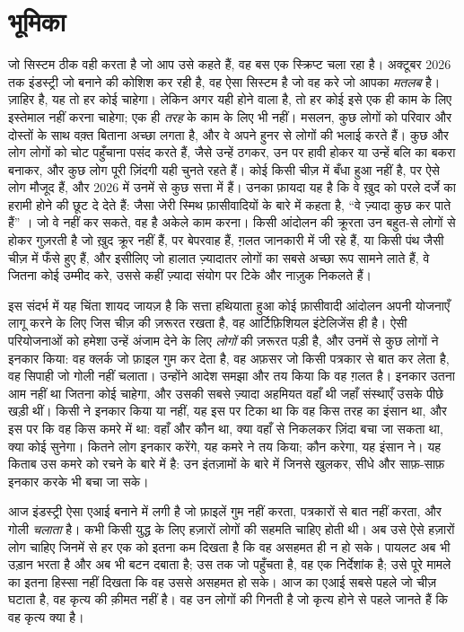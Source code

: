 \chapter*{भूमिका}
जो सिस्टम ठीक वही करता है जो आप उसे कहते हैं, वह बस एक स्क्रिप्ट चला रहा है। अक्टूबर 2026 तक इंडस्ट्री जो बनाने की कोशिश कर रही है, वह ऐसा सिस्टम है जो वह करे जो आपका \emph{मतलब} है। ज़ाहिर है, यह तो हर कोई चाहेगा। लेकिन अगर यही होने वाला है, तो हर कोई इसे एक ही काम के लिए इस्तेमाल नहीं करना चाहेगा; एक ही \emph{तरह} के काम के लिए भी नहीं। मसलन, कुछ लोगों को परिवार और दोस्तों के साथ वक़्त बिताना अच्छा लगता है, और वे अपने हुनर से लोगों की भलाई करते हैं। कुछ और लोग लोगों को चोट पहुँचाना पसंद करते हैं, जैसे उन्हें ठगकर, उन पर हावी होकर या उन्हें बलि का बकरा बनाकर, और कुछ लोग पूरी ज़िंदगी यही चुनते रहते हैं। कोई किसी चीज़ में बँधा हुआ नहीं है, पर ऐसे लोग मौजूद हैं, और 2026 में उनमें से कुछ सत्ता में हैं। उनका फ़ायदा यह है कि वे ख़ुद को परले दर्जे का हरामी होने की छूट दे देते हैं: जैसा जेरी स्मिथ फ़ासीवादियों के बारे में कहता है, “वे ज़्यादा कुछ कर पाते हैं” \autocite{rickandmorty2023}। जो वे नहीं कर सकते, वह है अकेले काम करना। किसी आंदोलन की क्रूरता उन बहुत-से लोगों से होकर गुज़रती है जो ख़ुद क्रूर नहीं हैं, पर बेपरवाह हैं, ग़लत जानकारी में जी रहे हैं, या किसी पंथ जैसी चीज़ में फँसे हुए हैं, और इसीलिए जो हालात ज़्यादातर लोगों का सबसे अच्छा रूप सामने लाते हैं, वे जितना कोई उम्मीद करे, उससे कहीं ज़्यादा संयोग पर टिके और नाज़ुक निकलते हैं।

इस संदर्भ में यह चिंता शायद जायज़ है कि सत्ता हथियाता हुआ कोई फ़ासीवादी आंदोलन अपनी योजनाएँ लागू करने के लिए जिस चीज़ की ज़रूरत रखता है, वह आर्टिफ़िशियल इंटेलिजेंस ही है। ऐसी परियोजनाओं को हमेशा उन्हें अंजाम देने के लिए \emph{लोगों} की ज़रूरत पड़ी है, और उनमें से कुछ लोगों ने इनकार किया: वह क्लर्क जो फ़ाइल गुम कर देता है, वह अफ़सर जो किसी पत्रकार से बात कर लेता है, वह सिपाही जो गोली नहीं चलाता। उन्होंने आदेश समझा और तय किया कि वह ग़लत है। इनकार उतना आम नहीं था जितना कोई चाहेगा, और उसकी सबसे ज़्यादा अहमियत वहाँ थी जहाँ संस्थाएँ उसके पीछे खड़ी थीं। किसी ने इनकार किया या नहीं, यह इस पर टिका था कि वह किस तरह का इंसान था, और इस पर कि वह किस कमरे में था: वहाँ और कौन था, क्या वहाँ से निकलकर ज़िंदा बचा जा सकता था, क्या कोई सुनेगा। कितने लोग इनकार करेंगे, यह कमरे ने तय किया; कौन करेगा, यह इंसान ने। यह किताब उस कमरे को रचने के बारे में है: उन इंतज़ामों के बारे में जिनसे खुलकर, सीधे और साफ़-साफ़ इनकार करके भी बचा जा सके।

आज इंडस्ट्री ऐसा एआई बनाने में लगी है जो फ़ाइलें गुम नहीं करता, पत्रकारों से बात नहीं करता, और गोली \emph{चलाता} है। कभी किसी युद्ध के लिए हज़ारों लोगों की सहमति चाहिए होती थी। अब उसे ऐसे हज़ारों लोग चाहिए जिनमें से हर एक को इतना कम दिखता है कि वह असहमत ही न हो सके। पायलट अब भी उड़ान भरता है और अब भी बटन दबाता है; उस तक जो पहुँचता है, वह एक निर्देशांक है; उसे पूरे मामले का इतना हिस्सा नहीं दिखता कि वह उससे असहमत हो सके। आज का एआई सबसे पहले जो चीज़ घटाता है, वह कृत्य की क़ीमत नहीं है। वह उन लोगों की गिनती है जो कृत्य होने से पहले जानते हैं कि वह कृत्य क्या है।

